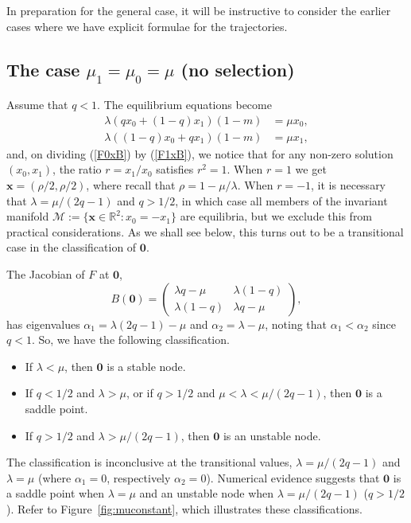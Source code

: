 \documentclass[12pt]{article}
\newcommand\R{\ensuremath{\mathbb{R}}}
\newcommand{\M}{\mathcal{M}}
\newcommand{\bzero}{\boldsymbol{0}}
\newcommand{\bx}{\boldsymbol{x}}
\begin{document}
In preparation for the general case,
it will be instructive to consider the earlier cases where we
have explicit formulae for the trajectories.

\subsection{The case $\mu_1=\mu_0=\mu$ (no selection)}

Assume that $q<1$. The equilibrium equations become
\begin{align}
\lambda(q x_0 + (1-q)x_1)(1-m)&=\mu x_0,
\label{F0xB}
\\
\lambda((1-q) x_0 + q x_1)(1-m)&=\mu x_1,
\label{F1xB}
\end{align}
and, on dividing (\ref{F0xB}) by (\ref{F1xB}), we notice that
for any non-zero solution $(x_0,x_1)$, the ratio
$r=x_1/x_0$ satisfies $r^2=1$. 
When $r=1$ we get 
$\bx=(\rho/2,\rho/2)$, where recall that $\rho=1-\mu/\lambda$. 
When $r=-1$, it is necessary that
$\lambda=\mu/(2q-1)$ and $q>1/2$, in which case all members of
the invariant manifold $\M:=\{\bx\in \R^2: x_0=-x_1\}$
are equilibria, but we exclude this from practical
considerations. As we shall see below, this turns out to be a
transitional case in the classification of $\bzero$.

The Jacobian of $F$ at $\bzero$,
$$
B(\bzero)=
\left(
\begin{matrix}
\lambda q-\mu & \lambda (1-q) \\
\lambda (1-q) &\lambda q-\mu  
\end{matrix}
\right),
$$
has eigenvalues $\alpha_1=\lambda (2q-1) - \mu$
and $\alpha_2=\lambda-\mu$, noting that $\alpha_1<\alpha_2$ since $q<1$.
So, we have the following classification.

\begin{itemize}
\item[(i)] If $\lambda<\mu$, then $\bzero$ is a stable node.
\item[(ii)] If $q<1/2$ and $\lambda>\mu$, or if
$q>1/2$ and $\mu<\lambda<\mu/(2q-1)$, then $\bzero$ is a saddle point.
\item[(iii)] If $q>1/2$ and $\lambda>\mu/(2q-1)$, then $\bzero$ is an unstable node.
\end{itemize}
The classification is inconclusive
at the transitional values, $\lambda=\mu/(2q-1)$ and $\lambda=\mu$
(where $\alpha_1=0$, respectively $\alpha_2=0$).
Numerical evidence suggests that
$\bzero$ is a saddle point when $\lambda=\mu$
and an unstable node when $\lambda=\mu/(2q-1)$ ($q>1/2$).
Refer to Figure~\ref{fig:muconstant}, which illustrates these classifications.
\end{document}
